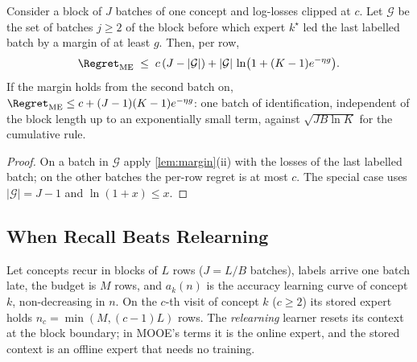 \begin{proposition}\label{prop:block}
Consider a block of $J$ batches of one concept and log-losses clipped at $c$. Let $\mathcal G$ be the set of batches
$j\ge2$ of the block before which expert $k^\star$ led the last labelled batch by a margin of at least $g$. Then,
per row,
\[
  \Regret_{\mathrm{ME}}\;\le\;c\,(J-|\mathcal G|)+|\mathcal G|\,\ln\bigl(1+(K-1)e^{-\eta g}\bigr).
\]
If the margin holds from the second batch on, $\Regret_{\mathrm{ME}}\le c+(J-1)(K-1)e^{-\eta g}$: one batch of
identification, independent of the block length up to an exponentially small term, against $\sqrt{JB\ln K}$ for the
cumulative rule.
\end{proposition}
\begin{proof}
On a batch in $\mathcal G$ apply \cref{lem:margin}(ii) with the losses of the last labelled batch; on the other
batches the per-row regret is at most $c$. The special case uses $|\mathcal G|=J-1$ and $\ln(1+x)\le x$.
\end{proof}

\subsection{When Recall Beats Relearning}

Let concepts recur in blocks of $L$ rows ($J=L/B$ batches), labels arrive one batch late, the budget is $M$ rows, and
$a_k(n)$ is the accuracy learning curve of concept $k$, non-decreasing in $n$. On the $c$-th visit of concept $k$
($c\ge2$) its stored expert holds $n_c=\min(M,(c-1)L)$ rows. The \emph{relearning} learner resets its context at the
block boundary; in MOOE's terms it is the online expert, and the stored context is an offline expert that needs no
training.

